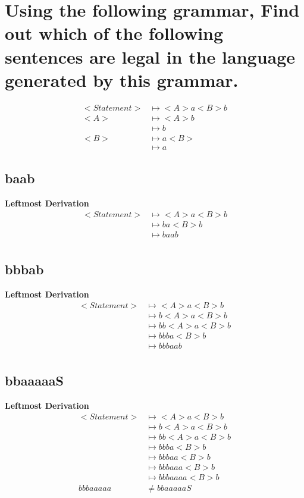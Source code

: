 \section{Using the following grammar, Find out which of the following sentences are legal in the language generated by this grammar.}
\begin{align*}
<Statement> &\mapsto <A>a<B>b \\
	<A> &\mapsto <A>b \\
	    &\mapsto b \\
        <B> &\mapsto a <B> \\
	    &\mapsto a
\end{align*}
\subsection{baab}
\textbf{Leftmost Derivation}
\begin{align*}
	<Statement> &\mapsto <A> a <B> b \\
	&\mapsto b a <B> b \\
	&\mapsto b a  a  b \\
\end{align*}
\subsection{bbbab}
\textbf{Leftmost Derivation}
\begin{align*}
	<Statement> &\mapsto <A> a <B> b \\
	&\mapsto b <A> a <B> b \\
	&\mapsto b b <A> a <B> b \\
	&\mapsto b b b a <B> b \\
	&\mapsto b b b a a b \\
\end{align*}
\subsection{bbaaaaaS}
\textbf{Leftmost Derivation}
\begin{align*}
	<Statement> &\mapsto <A> a <B> b \\
	&\mapsto b <A> a <B> b \\
	&\mapsto b b <A> a <B> b \\
	&\mapsto b b b a <B> b \\
	&\mapsto b b b a a <B> b \\
	&\mapsto b b b a a a <B> b \\
	&\mapsto b b b a a a  a <B> b \\
	b b b a a a  a a &\neq bbaaaaaS \\
\end{align*}

